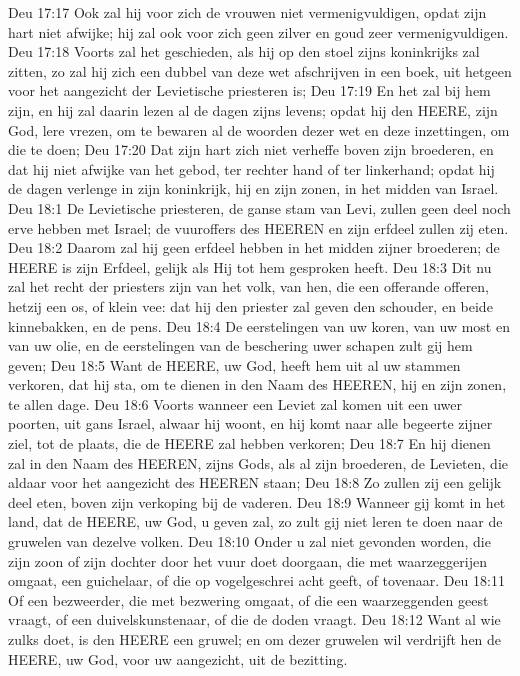 Deu 17:17  Ook zal hij voor zich de vrouwen niet vermenigvuldigen, opdat zijn hart niet afwijke; hij zal ook voor zich geen zilver en goud zeer vermenigvuldigen.
Deu 17:18  Voorts zal het geschieden, als hij op den stoel zijns koninkrijks zal zitten, zo zal hij zich een dubbel van deze wet afschrijven in een boek, uit hetgeen voor het aangezicht der Levietische priesteren is;
Deu 17:19  En het zal bij hem zijn, en hij zal daarin lezen al de dagen zijns levens; opdat hij den HEERE, zijn God, lere vrezen, om te bewaren al de woorden dezer wet en deze inzettingen, om die te doen;
Deu 17:20  Dat zijn hart zich niet verheffe boven zijn broederen, en dat hij niet afwijke van het gebod, ter rechter hand of ter linkerhand; opdat hij de dagen verlenge in zijn koninkrijk, hij en zijn zonen, in het midden van Israel.
Deu 18:1  De Levietische priesteren, de ganse stam van Levi, zullen geen deel noch erve hebben met Israel; de vuuroffers des HEEREN en zijn erfdeel zullen zij eten.
Deu 18:2  Daarom zal hij geen erfdeel hebben in het midden zijner broederen; de HEERE is zijn Erfdeel, gelijk als Hij tot hem gesproken heeft.
Deu 18:3  Dit nu zal het recht der priesters zijn van het volk, van hen, die een offerande offeren, hetzij een os, of klein vee: dat hij den priester zal geven den schouder, en beide kinnebakken, en de pens.
Deu 18:4  De eerstelingen van uw koren, van uw most en van uw olie, en de eerstelingen van de beschering uwer schapen zult gij hem geven;
Deu 18:5  Want de HEERE, uw God, heeft hem uit al uw stammen verkoren, dat hij sta, om te dienen in den Naam des HEEREN, hij en zijn zonen, te allen dage.
Deu 18:6  Voorts wanneer een Leviet zal komen uit een uwer poorten, uit gans Israel, alwaar hij woont, en hij komt naar alle begeerte zijner ziel, tot de plaats, die de HEERE zal hebben verkoren;
Deu 18:7  En hij dienen zal in den Naam des HEEREN, zijns Gods, als al zijn broederen, de Levieten, die aldaar voor het aangezicht des HEEREN staan;
Deu 18:8  Zo zullen zij een gelijk deel eten, boven zijn verkoping bij de vaderen.
Deu 18:9  Wanneer gij komt in het land, dat de HEERE, uw God, u geven zal, zo zult gij niet leren te doen naar de gruwelen van dezelve volken.
Deu 18:10  Onder u zal niet gevonden worden, die zijn zoon of zijn dochter door het vuur doet doorgaan, die met waarzeggerijen omgaat, een guichelaar, of die op vogelgeschrei acht geeft, of tovenaar.
Deu 18:11  Of een bezweerder, die met bezwering omgaat, of die een waarzeggenden geest vraagt, of een duivelskunstenaar, of die de doden vraagt.
Deu 18:12  Want al wie zulks doet, is den HEERE een gruwel; en om dezer gruwelen wil verdrijft hen de HEERE, uw God, voor uw aangezicht, uit de bezitting.
